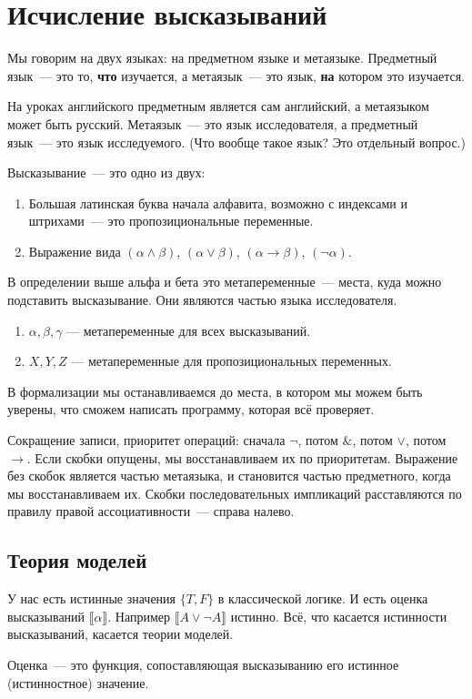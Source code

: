 
\section{Исчисление высказываний}
Мы говорим на двух языках: на предметном языке и метаязыке.
Предметный язык~--- это то, \textbf{что} изучается, а метаязык~--- это язык, \textbf{на} котором это изучается.

На уроках английского предметным является сам английский, а метаязыком может быть русский.
Метаязык~--- это язык исследователя, а предметный язык~--- это язык исследуемого.
(Что вообще такое язык? Это отдельный вопрос.)

Высказывание~--- это одно из двух: 
\begin{enumerate}
\item Большая латинская буква начала алфавита, возможно с индексами и штрихами~--- это пропозициональные переменные.
\item Выражение вида $(\alpha \land \beta)$, $(\alpha \lor \beta)$, $(\alpha \to \beta)$, $(\neg \alpha)$. 
\end{enumerate}

В определении выше альфа и бета это метапеременные~--- места, куда можно подставить высказывание.
Они являются частью языка исследователя.
\begin{enumerate}
\item $\alpha, \beta, \gamma$ --- метапеременные для всех высказываний.
\item $X, Y, Z$ --- метапеременные для пропозициональных переменных.
\end{enumerate}

В формализации мы останавливаемся до места, в котором мы можем быть уверены, что сможем написать программу, которая всё проверяет.

Сокращение записи, приоритет операций: сначала $\neg$, потом $\&$, потом $\vee$, потом $\to$.
Если скобки опущены, мы восстанавливаем их по приоритетам.
Выражение без скобок является частью метаязыка, и становится частью предметного, когда мы восстанавливаем их.
Скобки последовательных импликаций расставляются по правилу правой ассоциативности~--- справа налево.
\subsection{Теория моделей}
У нас есть истинные значения $\{T, F\}$ в классической логике. 
И есть оценка высказываний $\llbracket \alpha\rrbracket$. 
Например $\llbracket A \lor \neg A\rrbracket$ истинно.
Всё, что касается истинности высказываний, касается теории моделей. 
\begin{definition}
    Оценка~--- это функция, сопоставляющая высказыванию его истинное (истинностное) значение.
\end{definition}
